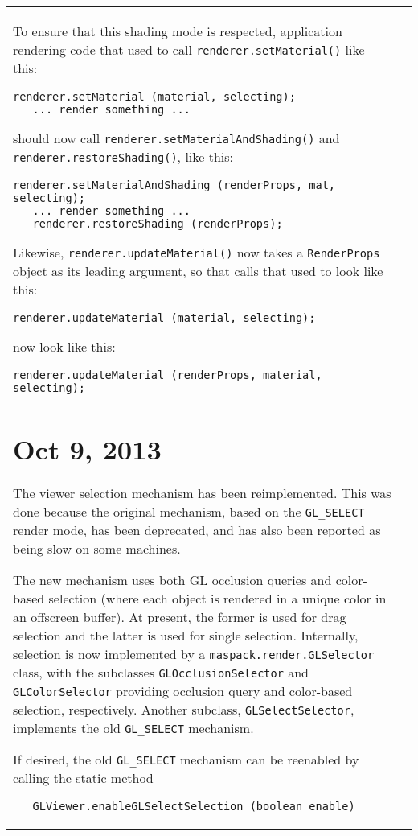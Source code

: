 \documentclass{article}
\begin{document}
\begin{tabular}{ll}
To ensure that this shading mode is respected, application
rendering code that used to call {\tt renderer.setMaterial()} like this:
\begin{lstlisting}[]
   renderer.setMaterial (material, selecting);
   ... render something ...
\end{lstlisting}
should now call {\tt renderer.setMaterialAndShading()} and 
{\tt renderer.restoreShading()},
like this:
\begin{lstlisting}[]
   renderer.setMaterialAndShading (renderProps, mat, selecting);
   ... render something ...
   renderer.restoreShading (renderProps);
\end{lstlisting}
Likewise, {\tt renderer.updateMaterial()} now takes a {\tt RenderProps}
object as its leading argument, so that calls that used to
look like this:
\begin{lstlisting}[]
   renderer.updateMaterial (material, selecting);
\end{lstlisting}
now look like this:
\begin{lstlisting}[]
   renderer.updateMaterial (renderProps, material, selecting);
\end{lstlisting}

\section*{Oct 9, 2013}

The viewer selection mechanism has been reimplemented. This was done
because the original mechanism, based on the {\tt GL\_SELECT} render
mode, has been deprecated, and has also been reported as being slow on
some machines.

The new mechanism uses both GL occlusion queries and color-based
selection (where each object is rendered in a unique color in an
offscreen buffer). At present, the former is used for drag selection
and the latter is used for single selection. Internally, selection is
now implemented by a {\tt maspack.render.GLSelector} class, with the
subclasses {\tt GLOcclusionSelector} and {\tt GLColorSelector}
providing occlusion query and color-based selection,
respectively. Another subclass, {\tt GLSelectSelector}, implements the
old {\tt GL\_SELECT} mechanism.

If desired, the old {\tt GL\_SELECT} mechanism can be reenabled by
calling the static method
\begin{verbatim}
   GLViewer.enableGLSelectSelection (boolean enable)
\end{verbatim}


\end{tabular}
\end{document}
